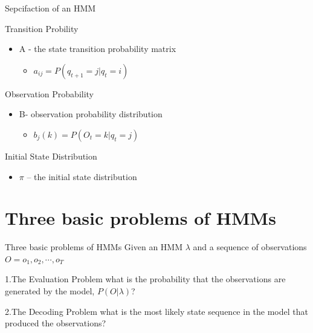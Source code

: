 \documentclass{beamer}
\begin{document}
\begin{frame}{Sepcifaction of an HMM}
    \begin{block}{Transition Probility}
        \begin{itemize}
        \item A - the state transition probability matrix
            \begin{itemize}
            \item $a_{ij} = P(q_{t+1} = j | q_{t}=i)$
            \end{itemize}
        \end{itemize}
    \end{block}

    \begin{block}{Observation Probability}
        \begin{itemize}
        \item B- observation probability distribution
            \begin{itemize}
            \item $b_j{(k)} = P(O_t=k|q_t=j)$
            \end{itemize}
        \end{itemize}
    \end{block}
    
    \begin{block}{Initial State Distribution}
        \begin{itemize}
        \item $\pi$ -- the initial state distribution
        \end{itemize}
    \end{block}
\end{frame}


\section{Three basic problems of HMMs}
\begin{frame}[t]{Three basic problems of HMMs}
    Given an HMM $\lambda$ and a sequence of observations $O=o_1,o_2,\cdots,o_T$
    \begin{block}{1.\quad The Evaluation Problem}
     what is the probability that the observations are generated by the model, $P(O|\lambda)$? 
    \end{block}

    \begin{block}{2.\quad The Decoding Problem}
    what is the most likely state sequence in the model that produced the observations?
    \end{block}

\end{frame}
    
\end{document}
